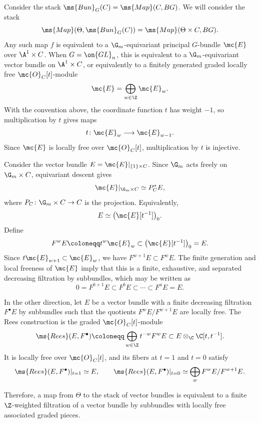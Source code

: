 Consider the stack \(\ms{Bun}_G(C) = \ms{Map}(C, BG)\). We will consider the stack
\[ \ms{Map}(\Theta, \ms{Bun}_G(C)) = \ms{Map}(\Theta \times C, BG). \]
Any such map \(f\) is equivalent to a \(\G_m\)-equivariant principal \(G\)-bundle \(\mc{E}\) over \(\A^1\times C\). When \(G=\on{GL}_n\), this is equivalent to a \(\G_m\)-equivariant vector bundle on \(\A^1\times C\), or equivalently to a finitely generated graded locally free \(\mc{O}_C[t]\)-module
\[
    \mc{E}=\bigoplus_{w\in\Z}\mc{E}_w.
\]
With the convention above, the coordinate function \(t\) has weight \(-1\), so multiplication by \(t\) gives maps
\[
    t\colon\mc{E}_w\longrightarrow\mc{E}_{w-1}.
\]
Since \(\mc{E}\) is locally free over \(\mc{O}_C[t]\), multiplication by \(t\) is injective.

\begin{rmk}
    Consider the vector bundle \(E=\mc{E}|_{\{1\}\times C}\). Since \(\G_m\) acts freely on \(\G_m\times C\), equivariant descent gives
    \[
        \mc{E}|_{\G_m\times C}\simeq P_C^*E,
    \]
    where \(P_C\colon\G_m\times C\to C\) is the projection. Equivalently,
    \[
        E\simeq\big(\mc{E}[t^{-1}]\big)_0.
    \]
    Define
    \[
        F^wE\coloneqq t^w\mc{E}_w\subset\big(\mc{E}[t^{-1}]\big)_0=E.
    \]
    Since \(t\mc{E}_{w+1}\subset\mc{E}_w\), we have \(F^{w+1}E\subset F^wE\). The finite generation and local freeness of \(\mc{E}\) imply that this is a finite, exhaustive, and separated decreasing filtration by subbundles, which may be written as
    \[
        0=F^{b+1}E\subset F^bE\subset\cdots\subset F^aE=E.
    \]

    In the other direction, let \(E\) be a vector bundle with a finite decreasing filtration \(F^\bullet E\) by subbundles such that the quotients \(F^wE/F^{w+1}E\) are locally free. The Rees construction is the graded \(\mc{O}_C[t]\)-module
    \[
        \ms{Rees}(E,F^\bullet)
        \coloneqq
        \bigoplus_{w\in\Z}t^{-w}F^wE
        \subset
        E\otimes_{\C}\C[t,t^{-1}].
    \]
    It is locally free over \(\mc{O}_C[t]\), and its fibers at \(t=1\) and \(t=0\) satisfy
    \[
        \ms{Rees}(E,F^\bullet)|_{t=1}\simeq E,
        \qquad
        \ms{Rees}(E,F^\bullet)|_{t=0}
        \simeq
        \bigoplus_w F^wE/F^{w+1}E.
    \]
\end{rmk}

Therefore, a map from \(\Theta\) to the stack of vector bundles is equivalent to a finite \(\Z\)-weighted filtration of a vector bundle by subbundles with locally free associated graded pieces.


